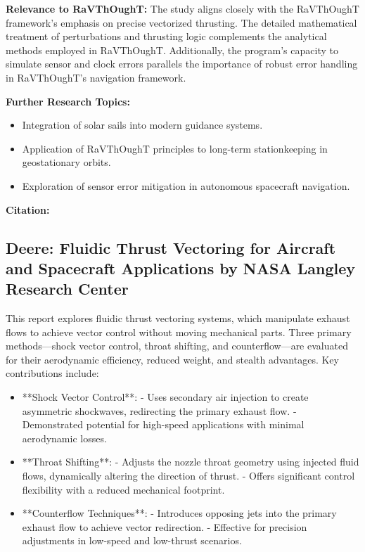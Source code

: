 \textbf{Relevance to RaVThOughT:} The study aligns closely with the RaVThOughT framework's emphasis on precise vectorized thrusting. The detailed mathematical treatment of perturbations and thrusting logic complements the analytical methods employed in RaVThOughT. Additionally, the program’s capacity to simulate sensor and clock errors parallels the importance of robust error handling in RaVThOughT's navigation framework.

\textbf{Further Research Topics:}
\begin{itemize}
    \item Integration of solar sails into modern guidance systems.
    \item Application of RaVThOughT principles to long-term stationkeeping in geostationary orbits.
    \item Exploration of sensor error mitigation in autonomous spacecraft navigation.
\end{itemize}

\textbf{Citation:} 

\subsection{Deere: Fluidic Thrust Vectoring for Aircraft and Spacecraft Applications by NASA Langley Research Center}

This report explores fluidic thrust vectoring systems, which manipulate exhaust flows to achieve vector control without moving mechanical parts. Three primary methods—shock vector control, throat shifting, and counterflow—are evaluated for their aerodynamic efficiency, reduced weight, and stealth advantages. Key contributions include:

\begin{itemize}
  \item **Shock Vector Control**:
  - Uses secondary air injection to create asymmetric shockwaves, redirecting the primary exhaust flow.
  - Demonstrated potential for high-speed applications with minimal aerodynamic losses.

  \item **Throat Shifting**:
  - Adjusts the nozzle throat geometry using injected fluid flows, dynamically altering the direction of thrust.
  - Offers significant control flexibility with a reduced mechanical footprint.

  \item **Counterflow Techniques**:
  - Introduces opposing jets into the primary exhaust flow to achieve vector redirection.
  - Effective for precision adjustments in low-speed and low-thrust scenarios.
\end{itemize}

